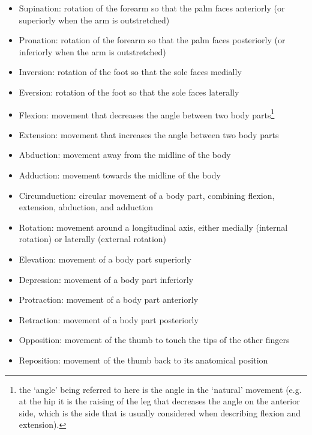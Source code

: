 \begin{itemize}
    \item Supination: rotation of the forearm so that the palm faces anteriorly (or superiorly when the arm is outstretched)
    \item Pronation: rotation of the forearm so that the palm faces posteriorly (or inferiorly when the arm is outstretched)
    \item Inversion: rotation of the foot so that the sole faces medially
    \item Eversion: rotation of the foot so that the sole faces laterally
    \item Flexion: movement that decreases the angle between two body parts\footnote{\label{fn:angle} the `angle' being referred to here is the angle in the `natural' movement (e.g. at the hip it is the raising of the leg that decreases the angle on the anterior side, which is the side that is usually considered when describing flexion and extension).}
    \item Extension: movement that increases the angle between two body parts\footnotemark[\value{footnote}]
    \item Abduction: movement away from the midline of the body
    \item Adduction: movement towards the midline of the body
    \item Circumduction: circular movement of a body part, combining flexion, extension, abduction, and adduction
    \item Rotation: movement around a longitudinal axis, either medially (internal rotation) or laterally (external rotation)
    \item Elevation: movement of a body part superiorly
    \item Depression: movement of a body part inferiorly
    \item Protraction: movement of a body part anteriorly
    \item Retraction: movement of a body part posteriorly
    \item Opposition: movement of the thumb to touch the tips of the other fingers
    \item Reposition: movement of the thumb back to its anatomical position
\end{itemize}
